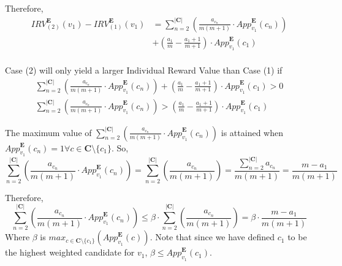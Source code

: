 \documentclass{article}
\begin{document}
Therefore,
\begin{equation}\label{IRV_DIFF}
\begin{aligned}
{IRV}^{\boldsymbol{E}}_{(2)}(v_1) - {IRV}^{\boldsymbol{E}}_{(1)}(v_1)
&=  \sum^{|\boldsymbol{C}|}_{n = 2}{\left(\frac{a_{c_{n}}}{m(m+1)}\cdot{App}^{\boldsymbol{E}}_{v_1}(c_{n})\right)}\\
&+ \left(\frac{a_1}{m}-\frac{a_{1}+1}{m+1}\right)\cdot{App}^{\boldsymbol{E}}_{v_1}(c_1)\\
\end{aligned}  
\end{equation}

Case (2) will only yield a larger Individual Reward Value than Case (1) if 
\begin{gather}
\sum^{|\boldsymbol{C}|}_{n = 2}{\left(\frac{a_{c_{n}}}{m(m+1)}\cdot{App}^{\boldsymbol{E}}_{v_1}(c_{n})\right)} + \left(\frac{a_1}{m}-\frac{a_{1}+1}{m+1}\right)\cdot{App}^{\boldsymbol{E}}_{v_1}(c_1) > 0\nonumber\\
\sum^{|\boldsymbol{C}|}_{n = 2}{\left(\frac{a_{c_{n}}}{m(m+1)}\cdot{App}^{\boldsymbol{E}}_{v_1}(c_{n})\right)} > \left(\frac{a_1}{m}-\frac{a_{1}+1}{m+1}\right)\cdot{App}^{\boldsymbol{E}}_{v_1}(c_1)
\end{gather}

The maximum value of $\sum^{|\boldsymbol{C}|}_{n = 2}{\left(\frac{a_{c_{n}}}{m(m+1)}\cdot{App}^{\boldsymbol{E}}_{v_1}(c_{n})\right)}$ is attained when ${App}^{\boldsymbol{E}}_{v_1}(c_{n}) = 1 \forall {c} \in \boldsymbol{C} \setminus \{c_1\}$. So,
\begin{equation}
\sum^{|\boldsymbol{C}|}_{n = 2}{\left(\frac{a_{c_{n}}}{m(m+1)}\cdot{App}^{\boldsymbol{E}}_{v_1}(c_{n})\right)} = \sum^{|\boldsymbol{C}|}_{n = 2}{\left(\frac{a_{c_{n}}}{m(m+1)}\right)} = \frac{\sum^{|\boldsymbol{C}|}_{n = 2}{a_{c_{n}}}}{m(m+1)} = \frac{m-a_1}{m(m+1)}
\end{equation}

Therefore,
\begin{equation}
\sum^{|\boldsymbol{C}|}_{n = 2}{\left(\frac{a_{c_{n}}}{m(m+1)}\cdot{App}^{\boldsymbol{E}}_{v_1}(c_{n})\right)} \leq \beta\cdot\sum^{|\boldsymbol{C}|}_{n = 2}{\left(\frac{a_{c_{n}}}{m(m+1)}\right)} = \beta\cdot\frac{m-a_1}{m(m+1)}
\end{equation}
Where $\beta$ is ${max}_{c \in \boldsymbol{C} \setminus \{c_1\}}\left({App}^{\boldsymbol{E}}_{v_1}(c)\right)$. Note that since we have defined $c_1$ to be the highest weighted candidate for $v_1$, $\beta \leq {App}^{\boldsymbol{E}}_{v_1}(c_1)$.\\
\end{document}
